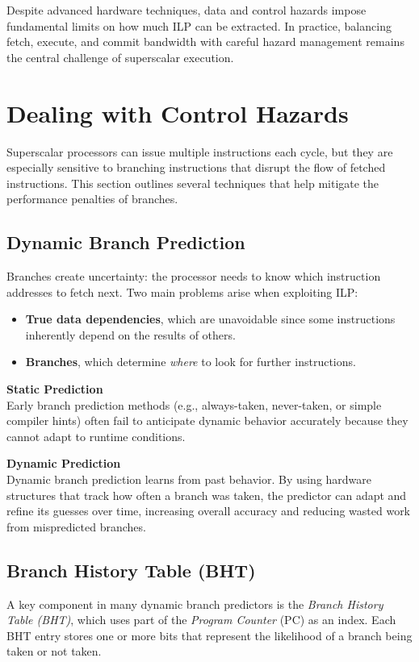 Despite advanced hardware techniques, data and control hazards impose fundamental limits on how much ILP can be extracted. In practice, balancing fetch, execute, and commit bandwidth with careful hazard management remains the central challenge of superscalar execution.

\section{Dealing with Control Hazards}
Superscalar processors can issue multiple instructions each cycle, but they are especially sensitive to branching instructions that disrupt the flow of fetched instructions. This section outlines several techniques that help mitigate the performance penalties of branches.

\subsection{Dynamic Branch Prediction}
\label{sec:branch-pred}
Branches create uncertainty: the processor needs to know which instruction addresses to fetch next. Two main problems arise when exploiting ILP:
\begin{itemize}
    \item \textbf{True data dependencies}, which are unavoidable since some instructions inherently depend on the results of others.
    \item \textbf{Branches}, which determine \emph{where} to look for further instructions.
\end{itemize}

\noindent
\textbf{Static Prediction}\\
Early branch prediction methods (e.g., always-taken, never-taken, or simple compiler hints) often fail to anticipate dynamic behavior accurately because they cannot adapt to runtime conditions.

\noindent
\textbf{Dynamic Prediction}\\
Dynamic branch prediction learns from past behavior. By using hardware structures that track how often a branch was taken, the predictor can adapt and refine its guesses over time, increasing overall accuracy and reducing wasted work from mispredicted branches.

\subsection{Branch History Table (BHT)}
A key component in many dynamic branch predictors is the \emph{Branch History Table (BHT)}, which uses part of the \textit{Program Counter} (PC) as an index. Each BHT entry stores one or more bits that represent the likelihood of a branch being taken or not taken.

